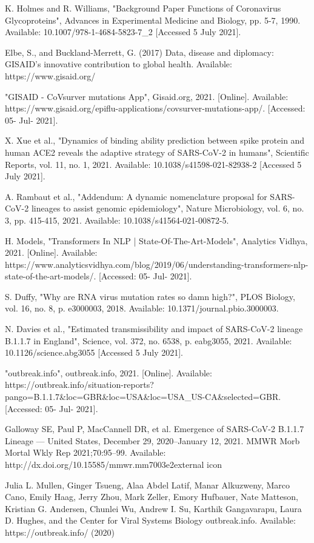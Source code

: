 \documentclass[conference,compsoc]{IEEEtran}
\begin{document}
\begin{thebibliography}{1}
K. Holmes and R. Williams, "Background Paper Functions of Coronavirus Glycoproteins", Advances in Experimental Medicine and Biology, pp. 5-7, 1990. Available: 10.1007/978-1-4684-5823-7\_2 [Accessed 5 July 2021].

Elbe, S., and Buckland-Merrett, G. (2017) Data, disease and diplomacy: GISAID's innovative contribution to global health. Available: https://www.gisaid.org/

"GISAID - CoVsurver mutations App", Gisaid.org, 2021. [Online]. Available: https://www.gisaid.org/epiflu-applications/covsurver-mutations-app/. [Accessed: 05- Jul- 2021].

X. Xue et al., "Dynamics of binding ability prediction between spike protein and human ACE2 reveals the adaptive strategy of SARS-CoV-2 in humans", Scientific Reports, vol. 11, no. 1, 2021. Available: 10.1038/s41598-021-82938-2 [Accessed 5 July 2021].

A. Rambaut et al., "Addendum: A dynamic nomenclature proposal for SARS-CoV-2 lineages to assist genomic epidemiology", Nature Microbiology, vol. 6, no. 3, pp. 415-415, 2021. Available: 10.1038/s41564-021-00872-5.

H. Models, "Transformers In NLP | State-Of-The-Art-Models", Analytics Vidhya, 2021. [Online]. Available: https://www.analyticsvidhya.com/blog/2019/06/understanding-transformers-nlp-state-of-the-art-models/. [Accessed: 05- Jul- 2021].

S. Duffy, "Why are RNA virus mutation rates so damn high?", PLOS Biology, vol. 16, no. 8, p. e3000003, 2018. Available: 10.1371/journal.pbio.3000003.

N. Davies et al., "Estimated transmissibility and impact of SARS-CoV-2 lineage B.1.1.7 in England", Science, vol. 372, no. 6538, p. eabg3055, 2021. Available: 10.1126/science.abg3055 [Accessed 5 July 2021].

"outbreak.info", outbreak.info, 2021. [Online]. Available: https://outbreak.info/situation-reports?pango=B.1.1.7\&loc=GBR\&loc=USA\&loc=USA\_US-CA\&selected=GBR. [Accessed: 05- Jul- 2021].

Galloway SE, Paul P, MacCannell DR, et al. Emergence of SARS-CoV-2 B.1.1.7 Lineage — United States, December 29, 2020–January 12, 2021. MMWR Morb Mortal Wkly Rep 2021;70:95–99. Available: http://dx.doi.org/10.15585/mmwr.mm7003e2external icon

Julia L. Mullen, Ginger Tsueng, Alaa Abdel Latif, Manar Alkuzweny, Marco Cano, Emily Haag, Jerry Zhou, Mark Zeller, Emory Hufbauer, Nate Matteson, Kristian G. Andersen, Chunlei Wu, Andrew I. Su, Karthik Gangavarapu, Laura D. Hughes, and the Center for Viral Systems Biology outbreak.info. Available: https://outbreak.info/ (2020)


\end{thebibliography}
\end{document}
